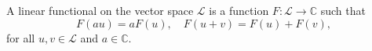 A linear functional on the vector space $\mathcal{L}$ is a function $F: \mathcal{L} \to \mathbb{C}$ such that
$$F(au) = aF(u), \quad F(u + v) = F(u) + F(v),$$
for all $u, v \in \mathcal{L}$ and $a \in \mathbb{C}$.
